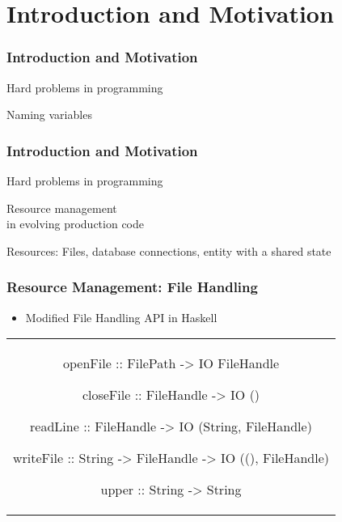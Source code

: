\section{Introduction and Motivation}\label{sec:introduction}

\begin{frame}[c]
  \frametitle{Introduction and Motivation}
  {\large
    \begin{center}
      Hard problems in programming

      {\LARGE \color{red}Naming variables}
    \end{center}
    }
\end{frame}

\begin{frame}
  \frametitle{Introduction and Motivation}
  \begin{large}
  \begin{center}
    Hard problems in programming

    {\LARGE \color{red}Resource management}
    \\{\normalsize  in evolving production code}

    {\normalsize Resources: Files, database connections, entity with a shared state}
\end{center}
\end{large}
\end{frame}

\begin{frame}[fragile, c]
  \frametitle{Resource Management: File Handling}
  \begin{center}
    \begin{itemize}
    \item Modified File Handling API in Haskell
    \end{itemize}
    \begin{tabular}[h]{c}
      \begin{haskell}
     openFile  :: FilePath   -> IO FileHandle

     closeFile :: FileHandle -> IO ()

     readLine  :: FileHandle -> IO (String, FileHandle)

     writeFile :: String     -> FileHandle
                             -> IO ((), FileHandle)


     upper     :: String     -> String
      \end{haskell}
    \end{tabular}
\end{center}
\end{frame}


